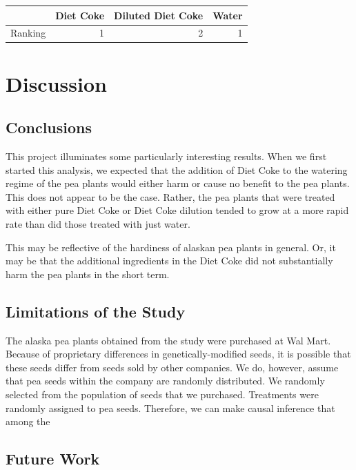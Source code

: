 \documentclass[preprint,12pt]{elsarticle}\usepackage[]{graphicx}\usepackage[]{color}
\begin{document}
\begin{table}[ht]
\centering
\begin{tabular}{lrrr}
  \hline
 & Diet Coke & Diluted Diet Coke & Water \\ 
  \hline
Ranking & 1 & 2 & 1 \\ 
  
   \hline
\end{tabular}
\end{table}


\section{Discussion}

\subsection{Conclusions}
This project illuminates some particularly interesting results. When we first started this analysis, we expected that the addition of Diet Coke to the watering regime of the pea plants would either harm or cause no benefit to the pea plants. This does not appear to be the case. Rather, the pea plants that were treated with either pure Diet Coke or Diet Coke dilution tended to grow at a more rapid rate than did those treated with just water. 

This may be reflective of the hardiness of alaskan pea plants in general. Or, it may be that the additional ingredients in the Diet Coke did not substantially harm the pea plants in the short term. 

\subsection{Limitations of the Study}

The alaska pea plants obtained from the study were purchased at Wal Mart. Because of proprietary differences in genetically-modified seeds, it is possible that these seeds differ from seeds sold by other companies. We do, however, assume that pea seeds within the company are randomly distributed. We randomly selected from the population of seeds that we purchased.  Treatments were randomly assigned to pea seeds. Therefore, we can make causal inference that among the 



\subsection{Future Work}
\end{document}
